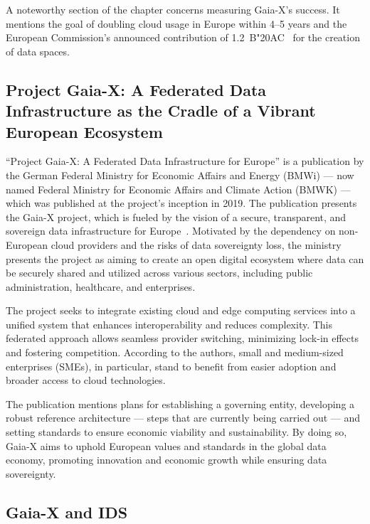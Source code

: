 A noteworthy section of the chapter concerns measuring Gaia-X's success.
It mentions the goal of doubling cloud usage in Europe within 4--5 years and the European Commission's announced contribution of 1.2~B\char"20AC~ for the creation of data spaces.

\subsection[Project Gaia-X]{Project Gaia-X: A Federated Data Infrastructure as the Cradle of a Vibrant European Ecosystem}\label{subsec:project-gaia-x:-a-federated-data-infrastructure-as-the-cradle-of-a-vibrant-european-ecosystem}

``Project Gaia-X: A Federated Data Infrastructure for Europe'' is a publication by the German Federal Ministry for Economic Affairs and Energy (BMWi) --- now named Federal Ministry for Economic Affairs and Climate Action (BMWK) --- which was published at the project's inception in 2019.
The publication presents the Gaia-X project, which is fueled by the vision of a secure, transparent, and sovereign data infrastructure for Europe~\cite{project_gaia_x}.
Motivated by the dependency on non-European cloud providers and the risks of data sovereignty loss, the ministry presents the project as aiming to create an open digital ecosystem where data can be securely shared and utilized across various sectors, including public administration, healthcare, and enterprises.

The project seeks to integrate existing cloud and edge computing services into a unified system that enhances interoperability and reduces complexity.
This federated approach allows seamless provider switching, minimizing lock-in effects and fostering competition.
According to the authors, small and medium-sized enterprises (SMEs), in particular, stand to benefit from easier adoption and broader access to cloud technologies.

The publication mentions plans for establishing a governing entity, developing a robust reference architecture --- steps that are currently being carried out --- and setting standards to ensure economic viability and sustainability.
By doing so, Gaia-X aims to uphold European values and standards in the global data economy, promoting innovation and economic growth while ensuring data sovereignty.

\subsection{Gaia-X and IDS}\label{subsec:gaia-x-and-ids}

